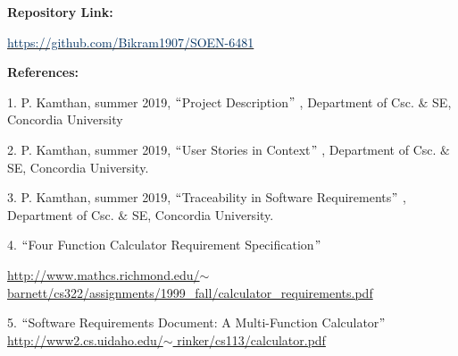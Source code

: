 \documentclass[12pt]{article}
\begin{document}
\vspace{\baselineskip}
{\fontsize{13pt}{15.6pt}\selectfont \textbf{Repository Link: }\par}\par


\vspace{\baselineskip}
\href{https://github.com/Bikram1907/SOEN-6481}{\textcolor[HTML]{023160}{https://github.com/Bikram1907/SOEN-6481}}\par


\vspace{\baselineskip}
{\fontsize{13pt}{15.6pt}\selectfont \textbf{References: }\par}\par

1. P. Kamthan, summer 2019, $``$Project Description$"$ , Department of Csc. $\&$  SE, Concordia University\par

2. P. Kamthan, summer 2019, $``$User Stories in Context$"$ , Department of Csc. $\&$  SE, Concordia University.\par

3. P. Kamthan, summer 2019, $``$Traceability in Software Requirements$"$ , Department of Csc. $\&$  SE, Concordia University.\par

4. $``$Four Function Calculator Requirement Specification$"$ \par

\href{http://www.mathcs.richmond.edu/~barnett/cs322/assignments/1999_fall/calculator_requirements.pdf}{http://www.mathcs.richmond.edu/$ \sim $ barnett/cs322/assignments/1999\_fall/calculator\_requirements.pdf}\par

5. $``$Software Requirements Document: A Multi-Function Calculator$"$  \href{http://www2.cs.uidaho.edu/~rinker/cs113/calculator.pdf}{http://www2.cs.uidaho.edu/$ \sim $ rinker/cs113/calculator.pdf}\par


\vspace{\baselineskip}

\vspace{\baselineskip}

\printbibliography
\end{document}
